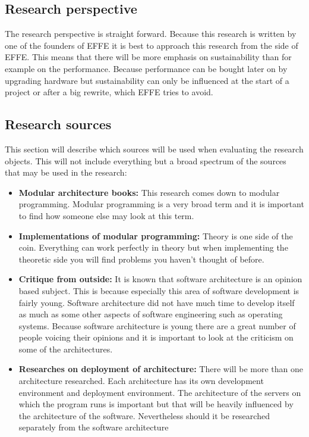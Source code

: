 \subsection{Research perspective}
The research perspective is straight forward. Because this research is written by one of the founders of EFFE it is best to approach this research from the side of EFFE. This means that there will be more emphasis on sustainability than for example on the performance. Because performance can be bought later on by upgrading hardware but sustainability can only be influenced at the start of a project or after a big rewrite, which EFFE tries to avoid.

\subsection{Research sources}
This section will describe which sources will be used when evaluating the research objects. This will not include everything but a broad spectrum of the sources that may be used in the research:

\begin{itemize}
	\item \textbf{Modular architecture books: }This research comes down to modular programming. Modular programming is a very broad term and it is important to find how someone else may look at this term.

	\item \textbf{Implementations of modular programming: }Theory is one side of the coin. Everything can work perfectly in theory but when implementing the theoretic side you will find problems you haven't thought of before.

	\item \textbf{Critique from outside: }It is known that software architecture is an opinion based subject. This is because especially this area of software development is fairly young. Software architecture did not have much time to develop itself as much as some other aspects of software engineering such as operating systems. Because software architecture is young there are a great number of people voicing their opinions and it is important to look at the criticism on some of the architectures.

	\item \textbf{Researches on deployment of architecture: } There will be more than one architecture researched. Each architecture has its own development environment and deployment environment. The architecture of the servers on which the program runs is important but that will be heavily influenced by the architecture of the software. Nevertheless should it be researched separately from the software architecture
\end{itemize}

